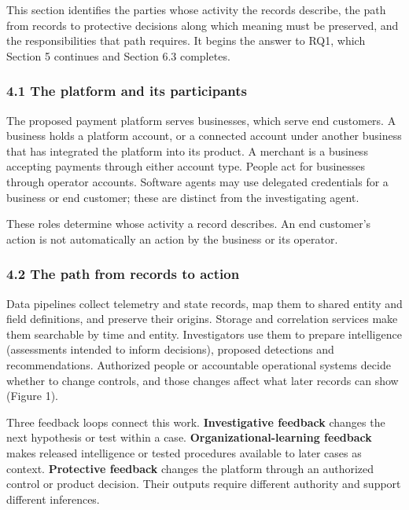 \documentclass[
  11pt,
]{article}
\begin{document}
\suppressfloats[t]

This section identifies the parties whose activity the records describe,
the path from records to protective decisions along which meaning must
be preserved, and the responsibilities that path requires. It begins the
answer to RQ1, which Section 5 continues and Section 6.3 completes.

\hypertarget{the-platform-and-its-participants}{%
\subsubsection{4.1 The platform and its
participants}\label{the-platform-and-its-participants}}

The proposed payment platform serves businesses, which serve end
customers. A business holds a platform account, or a connected account
under another business that has integrated the platform into its
product. A merchant is a business accepting payments through either
account type. People act for businesses through operator accounts.
Software agents may use delegated credentials for a business or end
customer; these are distinct from the investigating agent.

These roles determine whose activity a record describes. An end
customer's action is not automatically an action by the business or its
operator.

\hypertarget{the-path-from-records-to-action}{%
\subsubsection{4.2 The path from records to
action}\label{the-path-from-records-to-action}}

Data pipelines collect telemetry and state records, map them to shared
entity and field definitions, and preserve their origins. Storage and
correlation services make them searchable by time and entity.
Investigators use them to prepare intelligence (assessments intended to
inform decisions), proposed detections and recommendations. Authorized
people or accountable operational systems decide whether to change
controls, and those changes affect what later records can show (Figure
1).

Three feedback loops connect this work. \textbf{Investigative feedback}
changes the next hypothesis or test within a case.
\textbf{Organizational-learning feedback} makes released intelligence or
tested procedures available to later cases as context.
\textbf{Protective feedback} changes the platform through an authorized
control or product decision. Their outputs require different authority
and support different inferences.
\end{document}
